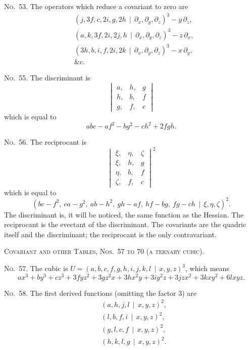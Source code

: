 \documentclass[11pt,a4paper]{book}
\begin{document}
\begin{center}
\noindent\textsc{No.~53.} The operators which reduce a covariant to zero are
\begin{align*}
&(j, 3f, c, 2i, g, 2h \, \mid\, \partial_x, \partial_y, \partial_z)^3 - y\,\partial_z,\\
&(a, k, 3f, 2i, 2j, h \, \mid\, \partial_x, \partial_y, \partial_z)^3 - z\,\partial_x,\\
&(3h, b, i, f, 2i, 2k \, \mid\, \partial_x, \partial_y, \partial_z)^3 - x\,\partial_y,\\
&\text{\&c.}
\end{align*}

\noindent\textsc{No.~55.} The discriminant is
\[
\begin{vmatrix}
a, & h, & g \\
h, & b, & f \\
g, & f, & c
\end{vmatrix}
\]
which is equal to
\[abc - af^2 - bg^2 - ch^2 + 2fgh.\]

\noindent\textsc{No.~56.} The reciprocant is
\[
\begin{vmatrix}
\xi, & \eta, & \zeta \\
\xi, & h, & g \\
\eta, & b, & f \\
\zeta, & f, & c
\end{vmatrix}^2
\]
which is equal to
\[(bc-f^2,\ ca-g^2,\ ab-h^2,\ gh-af,\ hf-bg,\ fg-ch \, \mid\, \xi, \eta, \zeta)^2.\]
The discriminant is, it will be noticed, the same function as the Hessian.
The reciprocant is the evectant of the discriminant.
The covariants are the quadric itself and the discriminant; the reciprocant is the only contravariant.

\clearpage
\noindent\textsc{Covariant and other Tables, Nos.~57 to 70 (a ternary cubic).}

\noindent\textsc{No.~57.} The cubic is $U = (a, b, c, f, g, h, i, j, k, l \, \mid\, x, y, z)^3$,
which means
\[ax^3 + by^3 + cz^3 + 3fyz^2 + 3gz^2x + 3hx^2y + 3iy^2z + 3jzx^2 + 3kxy^2 + 6lxyz.\]

\noindent\textsc{No.~58.} The first derived functions (omitting the factor 3) are
\begin{align*}
&(a, h, j, l \, \mid\, x, y, z)^2,\\
&(l, b, f, i \, \mid\, x, y, z)^2,\\
&(g, l, c, f \, \mid\, x, y, z)^2,\\
&(h, k, l, g \, \mid\, x, y, z)^2.
\end{align*}


\end{center}
\end{document}
